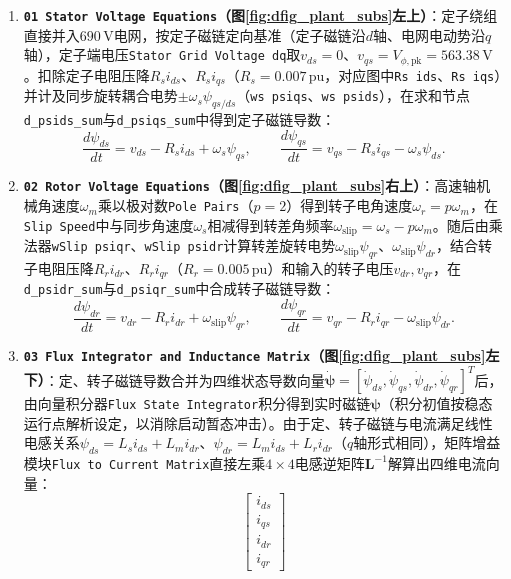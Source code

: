 \documentclass[UTF8,zihao=-4,fontset=none]{ctexrep}
\newcommand{\pu}{\mathrm{pu}}
\begin{document}
\begin{enumerate}
  \item \textbf{\texttt{01 Stator Voltage Equations}（图\ref{fig:dfig_plant_subs}左上）}：定子绕组直接并入\(690\,\mathrm{V}\)电网，按定子磁链定向基准（定子磁链沿\(d\)轴、电网电动势沿\(q\)轴），定子端电压\texttt{Stator Grid Voltage dq}取\(v_{ds}=0\)、\(v_{qs}=V_{\phi,\mathrm{pk}}=563.38\,\mathrm{V}\)。扣除定子电阻压降\(R_si_{ds}\)、\(R_si_{qs}\)（\(R_s=0.007\,\pu\)，对应图中\texttt{Rs ids}、\texttt{Rs iqs}）并计及同步旋转耦合电势\(\pm\omega_s\psi_{qs/ds}\)（\texttt{ws psiqs}、\texttt{ws psids}），在求和节点\texttt{d\_psids\_sum}与\texttt{d\_psiqs\_sum}中得到定子磁链导数：
  \begin{equation}
    \frac{d\psi_{ds}}{dt}=v_{ds}-R_si_{ds}+\omega_s\psi_{qs},\qquad
    \frac{d\psi_{qs}}{dt}=v_{qs}-R_si_{qs}-\omega_s\psi_{ds}.
  \end{equation}
  \item \textbf{\texttt{02 Rotor Voltage Equations}（图\ref{fig:dfig_plant_subs}右上）}：高速轴机械角速度\(\omega_m\)乘以极对数\texttt{Pole Pairs}（\(p=2\)）得到转子电角速度\(\omega_r=p\omega_m\)，在\texttt{Slip Speed}中与同步角速度\(\omega_s\)相减得到转差角频率\(\omega_{\mathrm{slip}}=\omega_s-p\omega_m\)。随后由乘法器\texttt{wSlip psiqr}、\texttt{wSlip psidr}计算转差旋转电势\(\omega_{\mathrm{slip}}\psi_{qr}\)、\(\omega_{\mathrm{slip}}\psi_{dr}\)，结合转子电阻压降\(R_ri_{dr}\)、\(R_ri_{qr}\)（\(R_r=0.005\,\pu\)）和输入的转子电压\(v_{dr},v_{qr}\)，在\texttt{d\_psidr\_sum}与\texttt{d\_psiqr\_sum}中合成转子磁链导数：
  \begin{equation}
    \frac{d\psi_{dr}}{dt}=v_{dr}-R_ri_{dr}+\omega_{\mathrm{slip}}\psi_{qr},\qquad
    \frac{d\psi_{qr}}{dt}=v_{qr}-R_ri_{qr}-\omega_{\mathrm{slip}}\psi_{dr}.
  \end{equation}
  \item \textbf{\texttt{03 Flux Integrator and Inductance Matrix}（图\ref{fig:dfig_plant_subs}左下）}：定、转子磁链导数合并为四维状态导数向量\(\dot{\boldsymbol{\psi}}=[\dot{\psi}_{ds},\dot{\psi}_{qs},\dot{\psi}_{dr},\dot{\psi}_{qr}]^T\)后，由向量积分器\texttt{Flux State Integrator}积分得到实时磁链\(\boldsymbol{\psi}\)（积分初值按稳态运行点解析设定，以消除启动暂态冲击）。由于定、转子磁链与电流满足线性电感关系\(\psi_{ds}=L_si_{ds}+L_mi_{dr}\)、\(\psi_{dr}=L_mi_{ds}+L_ri_{dr}\)（\(q\)轴形式相同），矩阵增益模块\texttt{Flux to Current Matrix}直接左乘\(4\times4\)电感逆矩阵\(\mathbf{L}^{-1}\)解算出四维电流向量：
  \begin{equation}
    \begin{bmatrix}i_{ds}\\i_{qs}\\i_{dr}\\i_{qr}\end{bmatrix}

\end{equation}
\end{enumerate}
\end{document}

